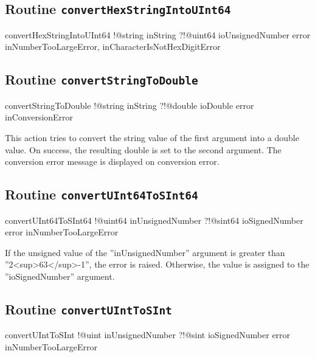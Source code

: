 \subsection{Routine \texttt{convertHexStringIntoUInt64}}

\begin{galgas}
convertHexStringIntoUInt64 !@string inString
                           ?!@uint64 ioUnsignedNumber
                           error inNumberTooLargeError,
                                 inCharacterIsNotHexDigitError
\end{galgas}

\subsection{Routine \texttt{convertStringToDouble}}

\begin{galgas}
convertStringToDouble !@string inString
                      ?!@double ioDouble
                      error inConversionError
\end{galgas}

This action tries to convert the string value of the first argument into a double value. On success, the resulting double is set to the second argument. The conversion error message is displayed on conversion error.

\subsection{Routine \texttt{convertUInt64ToSInt64}}

\begin{galgas}
convertUInt64ToSInt64 !@uint64 inUnsignedNumber
                      ?!@sint64 ioSignedNumber
                      error inNumberTooLargeError
\end{galgas}

If the unsigned value of the ''inUnsignedNumber'' argument is greater than ''2<sup>63</sup>-1'', the error is raised. Otherwise, the value is assigned to the ''ioSignedNumber'' argument.

\subsection{Routine \texttt{convertUIntToSInt}}

\begin{galgas}
convertUIntToSInt !@uint inUnsignedNumber
                  ?!@sint ioSignedNumber
                  error inNumberTooLargeError
\end{galgas}

